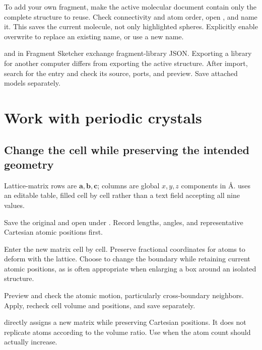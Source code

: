 To add your own fragment, make the active molecular document contain only the complete structure to reuse. Check connectivity and atom order, open , and name it. This saves the current molecule, not only highlighted spheres. Explicitly enable overwrite to replace an existing name, or use a new name.

 and  in Fragment Sketcher exchange fragment-library JSON. Exporting a library for another computer differs from exporting the active structure. After import, search for the entry and check its source, ports, and preview. Save attached models separately.

\section{Work with periodic crystals}

\subsection{Change the cell while preserving the intended geometry}\label{sec:lattice-transform-reference}

Lattice-matrix rows are $\mathbf a,\mathbf b,\mathbf c$; columns are global $x,y,z$ components in \AA.  uses an editable table, filled cell by cell rather than a text field accepting all nine values.



\begin{steps}
  \item Save the original and open  under . Record lengths, angles, and representative Cartesian atomic positions first.
  \item Enter the new matrix cell by cell. Preserve fractional coordinates for atoms to deform with the lattice. Choose  to change the boundary while retaining current atomic positions, as is often appropriate when enlarging a box around an isolated structure.
  \item Preview and check the atomic motion, particularly cross-boundary neighbors. Apply, recheck cell volume and positions, and save separately.
\end{steps}

 directly assigns a new matrix while preserving Cartesian positions. It does not replicate atoms according to the volume ratio. Use  when the atom count should actually increase.

